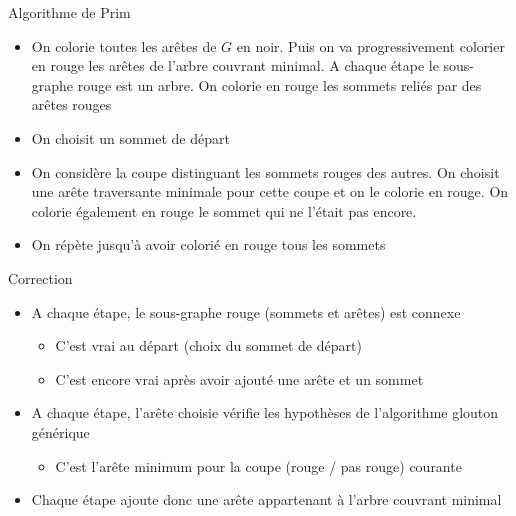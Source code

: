 \begin{frame}{Algorithme de Prim}
    \label{def:prim}
    \begin{itemize}
        \item On colorie toutes les arêtes de $G$ en noir. Puis on va progressivement colorier en rouge les arêtes de l'arbre couvrant minimal. A chaque étape le sous-graphe rouge est un arbre. On colorie en rouge les sommets reliés par des arêtes rouges
        \item On choisit un sommet de départ
        \item On considère la coupe distinguant  les sommets rouges des autres. On choisit une arête traversante minimale pour cette coupe et on le colorie en rouge. On colorie également en rouge le sommet qui ne l'était pas encore.
        \item On répète jusqu'à avoir colorié en rouge tous les sommets 
    \end{itemize}
\end{frame}

\begin{frame}{Correction}
\begin{itemize}
    \item A chaque étape, le sous-graphe rouge (sommets et arêtes) est connexe 
    \begin{itemize}
        \item C'est vrai au départ (choix du sommet de départ)
        \item C'est encore vrai après avoir ajouté une arête et un sommet 
    \end{itemize}
    \item A chaque étape, l'arête choisie vérifie les hypothèses de l'algorithme glouton générique 
    \begin{itemize}
        \item C'est l'arête minimum pour la coupe (rouge / pas rouge) courante 
    \end{itemize}
    \item Chaque étape ajoute donc une arête appartenant à l'arbre couvrant minimal 
\end{itemize}
\end{frame}

